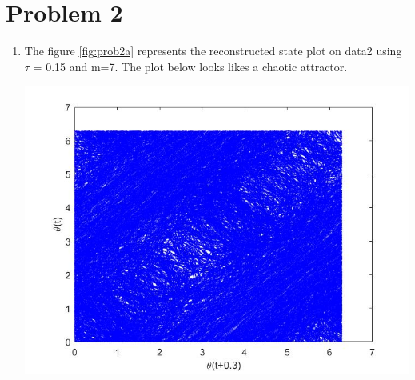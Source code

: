 \documentclass{article}
\begin{document}
\section*{Problem 2}
\begin{enumerate}[label=(\alph*)]
\item 
The figure \ref{fig:prob2a} represents the reconstructed state plot on data2 using $\tau$ = 0.15 and m=7. The plot below looks likes a chaotic attractor.\\
\begin{minipage}{\linewidth}
{
\centering 
\includegraphics[scale=0.4]{images/prob2a.jpg}
\label{fig:prob2a}
}
\end{minipage}


\end{enumerate}
\end{document}
